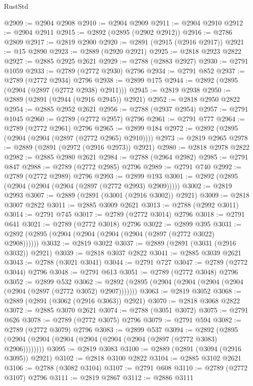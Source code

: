 \begin{lexlean}{RustStd}
\begin{coremodule}
@2909 := @2904 @2908
@2910 := @2904 @2909
@2911 := @2904 @2910
@2912 := @2904 @2911
@2915 := @2892 (@2895 (@2902 @2912))
@2916 := @2786 @2809
@2917 := @2819 @2900
@2920 := @2891 (@2915 (@2916 @2917))
@2921 := @15 @2890
@2923 := @2889 (@2920 @2921)
@2925 := @2818 @2923 @2822
@2927 := @2885 @2925 @2621
@2929 := @2788 (@2883 @2927)
@2930 := @2791 @1059
@2933 := @2789 (@2772 @2930) @2796
@2934 := @2791 @852
@2937 := @2789 (@2772 @2934) @2796
@2938 := @2899 @175
@2944 := @2892 (@2895 (@2904 (@2897 (@2772 @2938) @2911)))
@2945 := @2819 @2938
@2950 := @2889 (@2891 (@2944 (@2916 @2945)) @2921)
@2952 := @2818 @2950 @2822
@2954 := @2885 @2952 @2621
@2956 := @2788 (@2937 @2954)
@2957 := @2791 @1045
@2960 := @2789 (@2772 @2957) @2796
@2961 := @2791 @777
@2964 := @2789 (@2772 @2961) @2796
@2965 := @2899 @184
@2972 := @2892 (@2895 (@2904 (@2904 (@2897 (@2772 @2965) @2910))))
@2973 := @2819 @2965
@2978 := @2889 (@2891 (@2972 (@2916 @2973)) @2921)
@2980 := @2818 @2978 @2822
@2982 := @2885 @2980 @2621
@2984 := @2788 (@2964 @2982)
@2985 := @2791 @847
@2988 := @2789 (@2772 @2985) @2796
@2989 := @2791 @740
@2992 := @2789 (@2772 @2989) @2796
@2993 := @2899 @193
@3001 := @2892 (@2895 (@2904 (@2904 (@2904 (@2897 (@2772 @2993) @2909)))))
@3002 := @2819 @2993
@3007 := @2889 (@2891 (@3001 (@2916 @3002)) @2921)
@3009 := @2818 @3007 @2822
@3011 := @2885 @3009 @2621
@3013 := @2788 (@2992 @3011)
@3014 := @2791 @745
@3017 := @2789 (@2772 @3014) @2796
@3018 := @2791 @641
@3021 := @2789 (@2772 @3018) @2796
@3022 := @2899 @395
@3031 := @2892 (@2895 (@2904 (@2904 (@2904 (@2904 (@2897 (@2772 @3022) @2908))))))
@3032 := @2819 @3022
@3037 := @2889 (@2891 (@3031 (@2916 @3032)) @2921)
@3039 := @2818 @3037 @2822
@3041 := @2885 @3039 @2621
@3043 := @2788 (@3021 @3041)
@3044 := @2791 @727
@3047 := @2789 (@2772 @3044) @2796
@3048 := @2791 @613
@3051 := @2789 (@2772 @3048) @2796
@3052 := @2899 @532
@3062 := @2892 (@2895 (@2904 (@2904 (@2904 (@2904 (@2904 (@2897 (@2772 @3052) @2907)))))))
@3063 := @2819 @3052
@3068 := @2889 (@2891 (@3062 (@2916 @3063)) @2921)
@3070 := @2818 @3068 @2822
@3072 := @2885 @3070 @2621
@3074 := @2788 (@3051 @3072)
@3075 := @2791 @626
@3078 := @2789 (@2772 @3075) @2796
@3079 := @2791 @594
@3082 := @2789 (@2772 @3079) @2796
@3083 := @2899 @537
@3094 := @2892 (@2895 (@2904 (@2904 (@2904 (@2904 (@2904 (@2904 (@2897 (@2772 @3083) @2906))))))))
@3095 := @2819 @3083
@3100 := @2889 (@2891 (@3094 (@2916 @3095)) @2921)
@3102 := @2818 @3100 @2822
@3104 := @2885 @3102 @2621
@3106 := @2788 (@3082 @3104)
@3107 := @2791 @608
@3110 := @2789 (@2772 @3107) @2796
@3111 := @2819 @2867
@3112 := @2886 @3111

\end{coremodule}
\end{lexlean}

